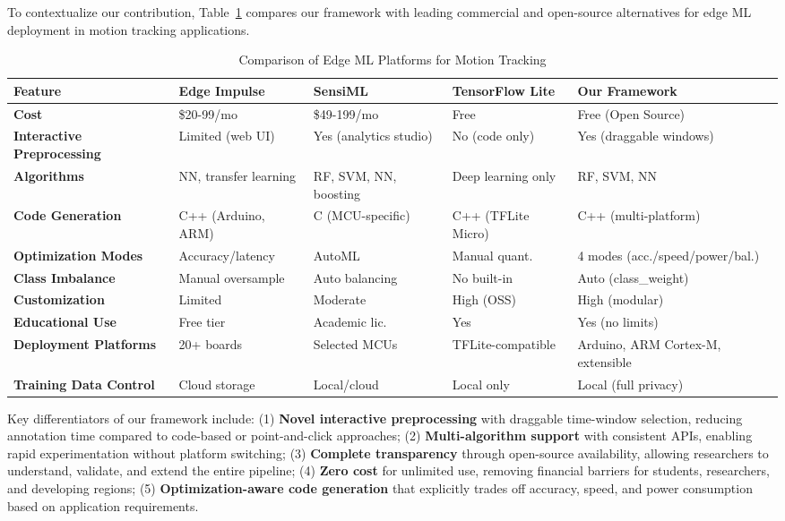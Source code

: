 To contextualize our contribution, Table~\ref{tab:platform_comparison} compares our framework with leading commercial and open-source alternatives for edge ML deployment in motion tracking applications.

\begin{table}[H]
\centering
\caption{Comparison of Edge ML Platforms for Motion Tracking}
\label{tab:platform_comparison}
\small
\begin{tabular}{@{}p{2.8cm}p{2.2cm}p{2.2cm}p{2.2cm}p{2.2cm}@{}}
\toprule
\textbf{Feature} & \textbf{Edge Impulse} & \textbf{SensiML} & \textbf{TensorFlow Lite} & \textbf{Our Framework} \\
\midrule
\textbf{Cost} & \$20-99/mo & \$49-199/mo & Free & Free (Open Source) \\
\midrule
\textbf{Interactive Preprocessing} & Limited (web UI) & Yes (analytics studio) & No (code only) & Yes (draggable windows) \\
\midrule
\textbf{Algorithms} & NN, transfer learning & RF, SVM, NN, boosting & Deep learning only & RF, SVM, NN \\
\midrule
\textbf{Code Generation} & C++ (Arduino, ARM) & C (MCU-specific) & C++ (TFLite Micro) & C++ (multi-platform) \\
\midrule
\textbf{Optimization Modes} & Accuracy/latency & AutoML & Manual quant. & 4 modes (acc./speed/power/bal.) \\
\midrule
\textbf{Class Imbalance} & Manual oversample & Auto balancing & No built-in & Auto (class\_weight) \\
\midrule
\textbf{Customization} & Limited & Moderate & High (OSS) & High (modular) \\
\midrule
\textbf{Educational Use} & Free tier & Academic lic. & Yes & Yes (no limits) \\
\midrule
\textbf{Deployment Platforms} & 20+ boards & Selected MCUs & TFLite-compatible & Arduino, ARM Cortex-M, extensible \\
\midrule
\textbf{Training Data Control} & Cloud storage & Local/cloud & Local only & Local (full privacy) \\
\bottomrule
\end{tabular}
\end{table}

Key differentiators of our framework include: (1) \textbf{Novel interactive preprocessing} with draggable time-window selection, reducing annotation time compared to code-based or point-and-click approaches; (2) \textbf{Multi-algorithm support} with consistent APIs, enabling rapid experimentation without platform switching; (3) \textbf{Complete transparency} through open-source availability, allowing researchers to understand, validate, and extend the entire pipeline; (4) \textbf{Zero cost} for unlimited use, removing financial barriers for students, researchers, and developing regions; (5) \textbf{Optimization-aware code generation} that explicitly trades off accuracy, speed, and power consumption based on application requirements.

